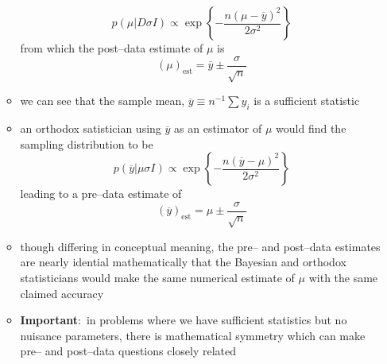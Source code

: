 \documentclass[../jaynes_prob_theory_notes.tex]{subfiles}
\begin{document}
\begin{itemize}
\begin{itemize}
                            \begin{equation*} 
                                p(\mu |D \sigma I) \propto \exp \left \{ - \frac{n{(\mu - \overline{y})}^2}{2 {\sigma}^2} \right \}
                            \end{equation*}
                            from which the post--data estimate of \(\mu\) is
                            \begin{equation*} 
                                {(\mu)}_{\text{est}} = \overline{y} \pm \frac{\sigma}{\sqrt{n}}
                            \end{equation*}
                        \item we can see that the sample mean, \(\overline{y} \equiv n^{-1} \sum y_i\) is a sufficient statistic
                        \item an orthodox satistician using \(\overline{y}\) as an estimator of \(\mu\) would find the sampling distribution to be
                            \begin{equation*} 
                                p(\overline{y}|\mu \sigma I) \propto \exp \left \{ - \frac{n{(\overline{y} - \mu)}^2}{2 \sigma^2} \right \}
                            \end{equation*}
                            leading to a pre--data estimate of 
                            \begin{equation*} 
                                {(\overline{y})}_{\text{est}} = \mu \pm \frac{\sigma}{\sqrt{n}}
                            \end{equation*}
                        \item though differing in conceptual meaning, the pre-- and post--data estimates are nearly idential mathematically that the Bayesian and orthodox statisticians would make the same numerical estimate of \(\mu\) with the same claimed accuracy
                        \item \textbf{Important}:\ in problems where we have sufficient statistics but no nuisance parameters, there is mathematical symmetry which can make pre-- and post--data questions closely related 
                    \end{itemize}
            \end{itemize}
\end{document}
